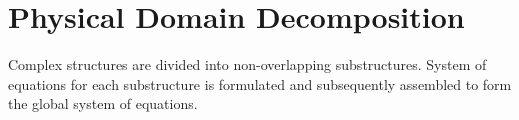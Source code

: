 \documentclass[../main.tex]{subfiles}
\begin{document}
 

\section{Physical Domain Decomposition} 

Complex structures are divided into non-overlapping substructures. 
System of equations for each substructure is formulated and subsequently assembled to form the global system of equations. 

 
 
 

\newpage 
 
\end{document}
